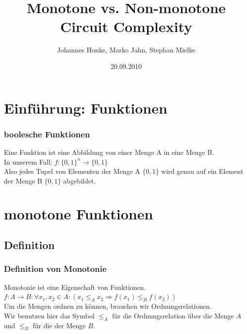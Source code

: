 \documentclass[hyperref={pdfpagelabels=false}]{beamer} %
\title{Monotone vs. Non-monotone Circuit Complexity}
\author{Johannes Honke, Marko Jahn, Stephan Mielke}
\institute{BTU-Cottbus}
\date{20.09.2010}
\begin{document}
  \begin{frame}[plain]
    \titlepage
    \tableofcontents
  \end{frame}

  \section{Einführung: Funktionen}
  \begin{frame} %
    \frametitle{boolesche Funktionen}
    Eine Funktion ist eine Abbildung von einer Menge A in eine Menge B.\\
    In unserem Fall: $f: \{0,1\}^{n} \rightarrow \{0,1\}$ \\
    Also jedes Tupel von Elementen der Menge A $\{0, 1\}$ wird genau auf ein Element der Menge B $\{0, 1\}$ abgebildet.
  \end{frame}

  \section{monotone Funktionen}
  \subsection*{Definition}
  \begin{frame}%
    \frametitle{Definition von Monotonie}
    Monotonie ist eine Eigenschaft von Funktionen.\\
    $f:A \rightarrow B: \forall x_1,x_2 \in A : (x_1 \leq_A x_2 \Rightarrow f(x_1) \leq_B f(x_2))$\\
    Um die Mengen ordnen zu können, brauchen wir Ordnungsrelationen.\\
    Wir benutzen hier das Symbol $\leq_A$ für die Ordnungsrelation über die Menge $A$ und $\leq_B$ für die der Menge $B$.
  \end{frame}
\end{document}
